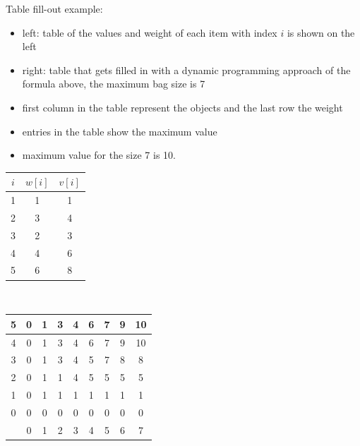 \documentclass[a4]{scrartcl}
\begin{document}
Table fill-out example:
\begin{itemize}
\item left: table of the values and weight of each item with index $i$ is shown on the left 
\item right: table that gets filled in with a dynamic programming approach of the formula above, the maximum bag size is 7
\item first column in the table represent the objects and the last row the weight 
\item entries in the table show the maximum value
\item maximum value for the size 7 is 10.
\end{itemize}
\begin{minipage}{0.3\textwidth}

\begin{tabular}{|c|c|c|}
\hline
$i$ & $w[i]$ & $v[i]$ \\
\hline
1 & 1 & 1 \\
2 & 3 & 4 \\
3 & 2 & 3 \\
4 & 4 & 6 \\
5 & 6 & 8 \\
\hline
\end{tabular}


\end{minipage}\begin{minipage}{0.1\textwidth}
\ 
\end{minipage}\begin{minipage}{0.6\textwidth}

\begin{tabular}{|c||c|c|c|c|c|c|c|c|}
\hline
5 & 0 & 1 & 3 & 4 & 6 & 7 & 9 & 10 \\
\hline
4 & 0 & 1 & 3 & 4 & 6 & 7 & 9 & 10 \\
\hline
3 & 0 & 1 & 3 & 4 & 5 & 7 & 8 & 8 \\
\hline
2 & 0 & 1 & 1 & 4 & 5 & 5 & 5 & 5 \\
\hline
1 & 0 & 1 & 1 & 1 & 1 & 1 & 1 & 1 \\
\hline
0 & 0 & 0 & 0 & 0 & 0 & 0 & 0 & 0 \\
\hline
\hline
  & 0 & 1 & 2 & 3 & 4 & 5 & 6 & 7 \\
\hline

\end{tabular}

\end{minipage}

\ \\
\end{document}
